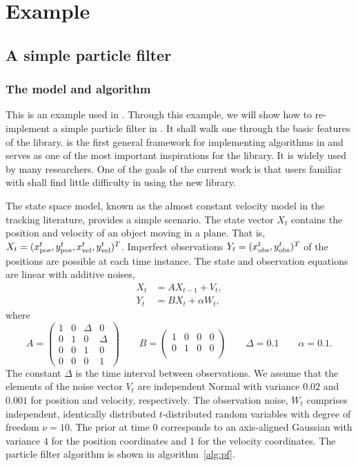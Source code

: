 \documentclass[11pt, fontset=Minion, showoverfull,
bib, mintcode, minted=cache]{marticle}
\begin{document}
\section{Example}
\label{sec:Example}

\subsection{A simple particle filter}
\label{sub:A simple particle filter}

\subsubsection{The model and algorithm}

This is an example used in \lsmctc \parencite{smctc}. Through this example, we
will show how to re-implement a simple particle filter in \vsmc. It shall walk
one through the basic features of the library. \lsmctc is the first general
framework for implementing \smc algorithms in \cpp and serves as one of the
most important inspirations for the \vsmc library. It is widely used by many
researchers. One of the goals of the current work is that users familiar with
\lsmctc shall find little difficulty in using the new library.

The state space model, known as the almost constant velocity model in the
tracking literature, provides a simple scenario. The state vector $X_t$
contains the position and velocity of an object moving in a plane. That is,
$X_t = (x_{\mathrm{pos}}^t, y_{\mathrm{pos}}^t, x_{\mathrm{vel}}^t, y_{\mathrm{vel}}^t)^T$. Imperfect observations $Y_t =
(x_{\mathrm{obs}}^t, y_{\mathrm{obs}}^t)^T$ of the positions are possible at each time instance. The
state and observation equations are linear with additive noises,
\begin{align*}
  X_t &= AX_{t-1} + V_t, \\
  Y_t &= BX_t + \alpha W_t,
\end{align*}
where
\begin{equation*}
  A = \begin{pmatrix}
    1 & 0 & \Delta & 0 \\
    0 & 1 & 0 & \Delta \\
    0 & 0 & 1 & 0 \\
    0 & 0 & 0 & 1
  \end{pmatrix} \qquad
  B = \begin{pmatrix}
    1 & 0 & 0 & 0 \\
    0 & 1 & 0 & 0 \\
  \end{pmatrix} \qquad
  \Delta = 0.1 \qquad
  \alpha = 0.1.
\end{equation*}
The constant $\Delta$ is the time interval between observations. We assume
that the elements of the noise vector $V_t$ are independent Normal with
variance $0.02$ and $0.001$ for position and velocity, respectively. The
observation noise, $W_t$ comprises independent, identically distributed
$t$-distributed random variables with degree of freedom $\nu = 10$. The prior
at time $0$ corresponds to an axis-aligned Gaussian with variance $4$ for the
position coordinates and $1$ for the velocity coordinates. The particle filter
algorithm is shown in algorithm~\ref{alg:pf}.
\end{document}
